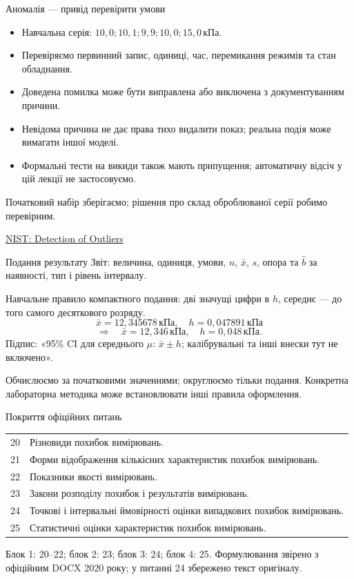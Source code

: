 \documentclass[aspectratio=169,11pt]{beamer}
\newcommand{\unit}[1]{\,\text{#1}}
\newcommand{\src}[2]{\par\vfill{\tiny\href{#1}{#2}}}
\begin{document}
\begin{frame}{Аномалія — привід перевірити умови}
\begin{itemize}
\item Навчальна серія: $10{,}0;10{,}1;9{,}9;10{,}0;15{,}0\unit{кПа}$.
\item Перевіряємо первинний запис, одиниці, час, перемикання режимів та стан обладнання.
\item Доведена помилка може бути виправлена або виключена з документуванням причини.
\item Невідома причина не дає права тихо видалити показ; реальна подія може вимагати іншої моделі.
\item Формальні тести на викиди також мають припущення; автоматичну відсіч у цій лекції не застосовуємо.
\end{itemize}
Початковий набір зберігаємо; рішення про склад оброблюваної серії робимо перевірним.
\src{https://www.itl.nist.gov/div898/handbook/eda/section3/eda35h.htm}{NIST: Detection of Outliers}
\end{frame}

\begin{frame}{Подання результату}
Звіт: величина, одиниця, умови, $n$, $\bar x$, $s$, опора та $\widehat b$ за наявності, тип і рівень інтервалу.
\medskip

Навчальне правило компактного подання: дві значущі цифри в $h$, середнє — до того самого десяткового розряду.
\[
\bar x=12{,}345678\unit{кПа},\quad h=0{,}047891\unit{кПа}
\]
\[
\Longrightarrow\quad\bar x=12{,}346\unit{кПа},\quad h=0{,}048\unit{кПа}.
\]
Підпис: «95\% CI для середнього $\mu$: $\bar x\pm h$; калібрувальні та інші внески тут не включено».
\medskip

Обчислюємо за початковими значеннями; округлюємо тільки подання. Конкретна лабораторна методика може встановлювати інші правила оформлення.
\end{frame}

\begin{frame}{Покриття офіційних питань}
\small
\begin{tabular}{cp{}}
\toprule
20 & Різновиди похибок вимірювань.\\[1mm]
21 & Форми відображення кількісних характеристик похибок вимірювань.\\[1mm]
22 & Показники якості вимірювань.\\[1mm]
23 & Закони розподілу похибок і результатів вимірювань.\\[1mm]
24 & Точкові і інтервальні ймовірності оцінки випадкових похибок вимірювань.\\[1mm]
25 & Статистичні оцінки характеристик похибок вимірювань.\\
\bottomrule
\end{tabular}
\medskip

Блок 1: 20–22; блок 2: 23; блок 3: 24; блок 4: 25. Формулювання звірено з офіційним DOCX 2020 року; у питанні 24 збережено текст оригіналу.
\end{frame}
\end{document}
